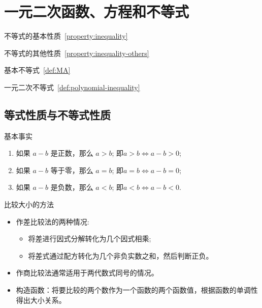 \chapter{一元二次函数、方程和不等式}
\label{ch:一元二次函数方程和不等式}

\begin{introduction}
  \item 不等式的基本性质~\ref{property:inequality}
  \item 不等式的其他性质~\ref{property:inequality-others}
  \item 基本不等式~\ref{def:MA}
  \item 一元二次不等式~\ref{def:polynomial-inequality}
\end{introduction}



\section{等式性质与不等式性质}

\begin{axiom}{基本事实}{}
\begin{enumerate}
\item 如果 $a-b$ 是正数，那么 $a > b$; 即$a>b \iff a-b>0$;
\item 如果 $a-b$ 等于零，那么 $a = b$; 即$a=b \iff a-b=0$;
\item 如果 $a-b$ 是负数，那么 $a < b$; 即$a<b \iff a-b<0$.
\end{enumerate}
\end{axiom}

\begin{note}{比较大小的方法}
\begin{itemize}
        \item 作差比较法的两种情况:
        \begin{itemize}
		\item 将差进行因式分解转化为几个因式相乘;
		\item 将差式通过配方转化为几个非负实数之和，然后判断正负。
        \end{itemize}
        \item 作商比较法通常适用于两代数式同号的情况。
        \item 构造函数：将要比较的两个数作为一个函数的两个函数值，根据函数的单调性得出大小关系。
\end{itemize}
\end{note}

\vspace{1cm}

